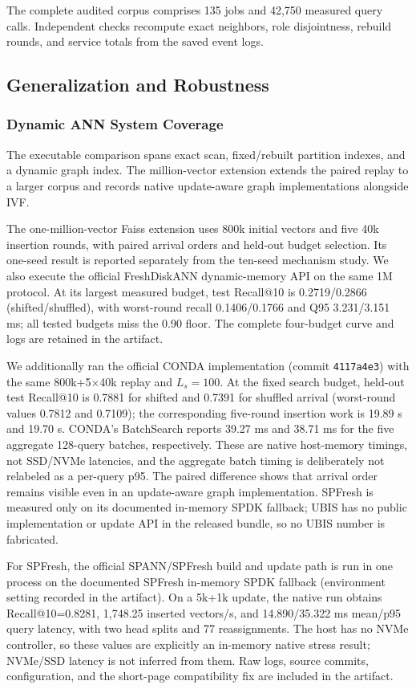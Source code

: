 The complete audited corpus comprises 135 jobs and 42,750 measured query calls.
Independent checks recompute exact neighbors, role disjointness, rebuild rounds, and
service totals from the saved event logs.

\subsection{Generalization and Robustness}
\label{sec:generalization}
\subsubsection{Dynamic ANN System Coverage}
The executable comparison spans exact scan, fixed/rebuilt partition indexes, and a
dynamic graph index. The million-vector extension extends the paired replay to a
larger corpus and records native update-aware graph implementations alongside IVF.
\label{sec:native_dynamic}

The one-million-vector Faiss extension uses 800k initial vectors and five 40k insertion
rounds, with paired arrival orders and held-out budget selection. Its one-seed result
is reported separately from the ten-seed mechanism study. We also execute the official
FreshDiskANN dynamic-memory API on the same 1M protocol. At its largest measured
budget, test Recall@10 is 0.2719/0.2866 (shifted/shuffled), with worst-round recall
0.1406/0.1766 and Q95 3.231/3.151 ms; all tested budgets miss the 0.90 floor.
The complete four-budget curve and logs are retained in the artifact.

We additionally ran the official CONDA implementation (commit
\texttt{4117a4e3}) with the same 800k+5$\times$40k replay and $L_s=100$.
At the fixed search budget, held-out test Recall@10 is 0.7881 for shifted and
0.7391 for shuffled arrival (worst-round values 0.7812 and 0.7109); the
corresponding five-round insertion work is 19.89 s and 19.70 s. CONDA's
BatchSearch reports 39.27 ms and 38.71 ms for the five aggregate 128-query
batches, respectively. These are native host-memory timings, not SSD/NVMe
latencies, and the aggregate batch timing is deliberately not relabeled as a
per-query p95. The paired difference shows that arrival order remains visible
even in an update-aware graph implementation. SPFresh is measured only on its
documented in-memory SPDK fallback; UBIS has no public implementation or update
API in the released bundle, so no UBIS number is fabricated.

For SPFresh, the official SPANN/SPFresh build and update path is run in one process on
the documented SPFresh in-memory SPDK fallback (environment setting recorded in the
artifact). On a 5k+1k update,
the native run obtains Recall@10=0.8281, 1,748.25 inserted vectors/s, and 14.890/35.322
ms mean/p95 query latency, with two head splits and 77 reassignments. The host has no
NVMe controller, so these values are explicitly an in-memory native stress result;
NVMe/SSD latency is not inferred from them. Raw logs, source commits, configuration,
and the short-page compatibility fix are included in the artifact.
